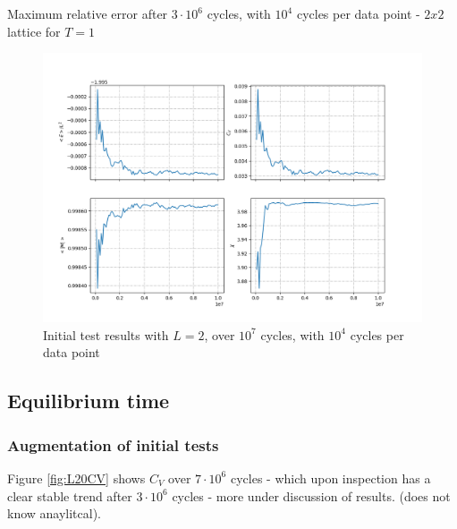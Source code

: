 \documentclass[%
oneside,                 %
final,                   %
10pt]{article}
\begin{document}
\begin{table}[h!tb]
    \centering
    \caption{Maximum relative error after $3 \cdot 10^6$ cycles, with $10^4$ cycles per data point - $2x2$ lattice for $T=1$}
\label{tab:abserrors}
\end{table}


\begin{figure}[!htb]
        \centering 
         \includegraphics[scale=.5]{../Results/initial_tests.png} 
        \caption{Initial test results with $L=2$, over $10^7$ cycles, with $10^4$ cycles per data point}
        \label{fig:initial_tests}   
\end{figure}  

\subsection{Equilibrium time}
\label{SS.R.EQtime }
\subsubsection*{Augmentation of initial tests}
Figure \ref{fig:L20CV} shows $C_V$ over $7 \cdot 10^6$ cycles - which upon  inspection has a clear stable trend after $3 \cdot 10^6$ cycles  - more under discussion of results. (does not know anaylitcal). \newline
\end{document}
